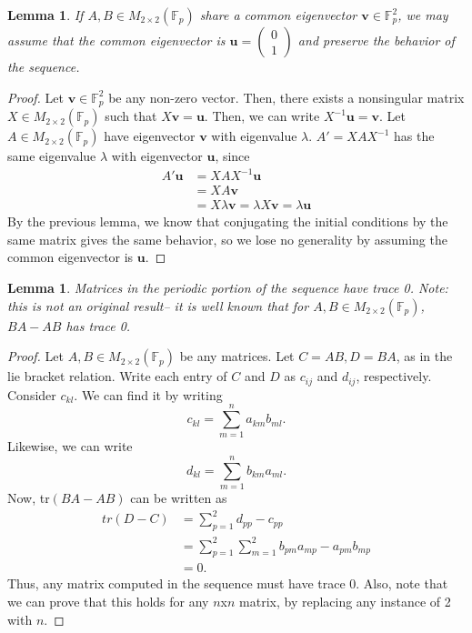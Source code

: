 \documentclass[12pt, letterpaper]{article}
\newtheorem{lemma}[theorem]{Lemma}
\theoremstyle{definition}
\newcommand{\M}{M_{2\times 2}(\mathbb{F}_p)}
\begin{document}
\begin{lemma}
If $A,B \in \M$ share a common eigenvector $\mathbf{v} \in \mathbb{F}_p^2$, we may assume that the common eigenvector is $\mathbf{u} = \begin{pmatrix} 0 \\ 1 \end{pmatrix}$ and preserve the behavior of the sequence.
\end{lemma}
\begin{proof}
Let $\mathbf{v} \in \mathbb{F}_p^2$ be any non-zero vector. Then, there exists a nonsingular matrix $X \in \M$ such that $X\mathbf{v} = \mathbf{u}$. Then, we can write $X^{-1}\mathbf{u} = \mathbf{v}$. Let $A \in \M$ have eigenvector $\mathbf{v}$ with eigenvalue $\lambda$. $A' = XAX^{-1}$ has the same eigenvalue $\lambda$ with eigenvector $\mathbf{u}$, since
\begin{align*}
A'\mathbf{u} &= XAX^{-1}\mathbf{u} \\
&= XA\mathbf{v} \\
&= X\lambda\mathbf{v} = \lambda X\mathbf{v} = \lambda\mathbf{u}
\end{align*}
By the previous lemma, we know that conjugating the initial conditions by the same matrix gives the same behavior, so we lose no generality by assuming the common eigenvector is $\mathbf{u}$.
\end{proof}

\begin{lemma}
Matrices in the periodic portion of the sequence have trace 0. Note: this is not an original result-- it is well known that for $A,B \in \M$, $BA-AB$ has trace 0.
\end{lemma}

\begin{proof}
Let $A,B \in \M$ be any matrices. Let $C=AB, D=BA$, as in the lie bracket relation. Write each entry of $C$ and $D$ as $c_{ij}$ and $d_{ij}$, respectively. Consider $c_{kl}$. We can find it by writing \[c_{kl} = \sum\limits_{m=1}^{n} a_{km}b_{ml}.\] Likewise, we can write \[d_{kl} = \sum\limits_{m=1}^{n} b_{km}a_{ml}.\] Now, tr$(BA-AB)$ can be written as
\begin{align*}
tr(D-C) &= \sum\limits_{p=1}^{2} d_{pp}-c_{pp} \\
&= \sum\limits_{p=1}^{2} \sum\limits_{m=1}^{2}b_{pm}a_{mp}-a_{pm}b_{mp} \\
&= 0.
\end{align*}
Thus, any matrix computed in the sequence must have trace 0. Also, note that we can prove that this holds for any $n$x$n$ matrix, by replacing any instance of 2 with $n$.
\end{proof}
\end{document}
